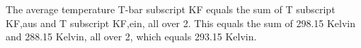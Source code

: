 The average temperature T-bar subscript KF equals the sum of T subscript KF,aus and T subscript KF,ein, all over 2. This equals the sum of 298.15 Kelvin and 288.15 Kelvin, all over 2, which equals 293.15 Kelvin.